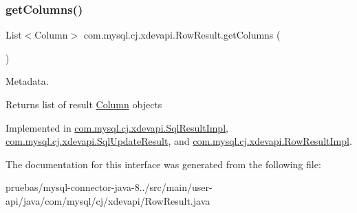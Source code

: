 \mbox{\label{interfacecom_1_1mysql_1_1cj_1_1xdevapi_1_1_row_result_a4bd495dadd5549516c0f32366f8d77c7}} 
\subsubsection{\texorpdfstring{get\+Columns()}{getColumns()}}
{\footnotesize\ttfamily List$<$Column$>$ com.\+mysql.\+cj.\+xdevapi.\+Row\+Result.\+get\+Columns (\begin{DoxyParamCaption}{ }\end{DoxyParamCaption})}

Metadata.

\begin{DoxyReturn}{Returns}
list of result \mbox{\hyperlink{interfacecom_1_1mysql_1_1cj_1_1xdevapi_1_1_column}{Column}} objects 
\end{DoxyReturn}


Implemented in \mbox{\hyperlink{classcom_1_1mysql_1_1cj_1_1xdevapi_1_1_sql_result_impl_a284f0953dcca6644eb9eff7749e32f9b}{com.\+mysql.\+cj.\+xdevapi.\+Sql\+Result\+Impl}}, \mbox{\hyperlink{classcom_1_1mysql_1_1cj_1_1xdevapi_1_1_sql_update_result_a229524cce1f3a1157e52d8f3d7b9dfc1}{com.\+mysql.\+cj.\+xdevapi.\+Sql\+Update\+Result}}, and \mbox{\hyperlink{classcom_1_1mysql_1_1cj_1_1xdevapi_1_1_row_result_impl_a080528edc647e5ab131333d69042b167}{com.\+mysql.\+cj.\+xdevapi.\+Row\+Result\+Impl}}.



The documentation for this interface was generated from the following file\+:\begin{DoxyCompactItemize}
\item 
pruebas/mysql-\/connector-\/java-\/8../src/main/user-\/api/java/com/mysql/cj/xdevapi/Row\+Result.\+java\end{DoxyCompactItemize}
